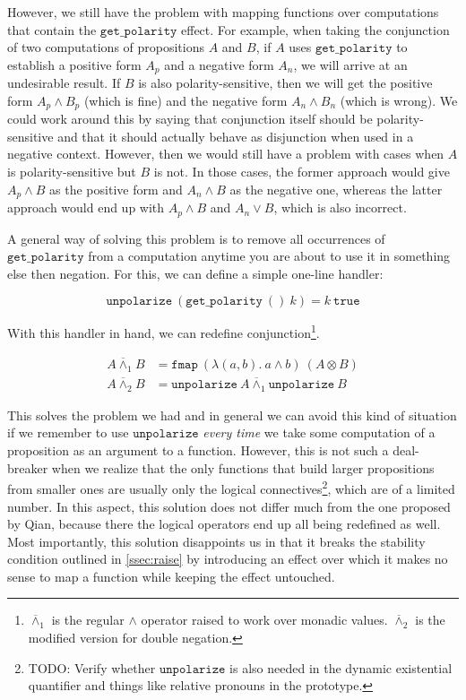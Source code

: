 \documentclass[a4paper,11pt,DIV=12]{scrartcl}
\newcommand{\dand}{\mathbin{\overline{\land}}}
\begin{document}
However, we still have the problem with mapping functions over computations
that contain the $\texttt{get\_polarity}$ effect. For example, when taking
the conjunction of two computations of propositions $A$ and $B$, if $A$
uses $\texttt{get\_polarity}$ to establish a positive form $A_p$ and a
negative form $A_n$, we will arrive at an undesirable result. If $B$ is
also polarity-sensitive, then we will get the positive form $A_p \land B_p$
(which is fine) and the negative form $A_n \land B_n$ (which is wrong). We
could work around this by saying that conjunction itself should be
polarity-sensitive and that it should actually behave as disjunction when
used in a negative context. However, then we would still have a problem
with cases when $A$ is polarity-sensitive but $B$ is not. In those cases,
the former approach would give $A_p \land B$ as the positive form and $A_n
\land B$ as the negative one, whereas the latter approach would end up with
$A_p \land B$ and $A_n \lor B$, which is also incorrect.

A general way of solving this problem is to remove all occurrences of
$\texttt{get\_polarity}$ from a computation anytime you are about to use it
in something else then negation. For this, we can define a simple one-line
handler:

$$
\texttt{unpolarize}\ (\texttt{get\_polarity}\ ()\ k) = k\ \texttt{true}
$$

With this handler in hand, we can redefine conjunction\footnote{$\dand_1$
  is the regular $\land$ operator raised to work over monadic
  values. $\dand_2$ is the modified version for double negation.}.

\begin{align*}
A \dand_1 B &= \texttt{fmap}\ (\lambda (a, b).\ a \land b)\ (A \otimes B) \\
A \dand_2 B &= \texttt{unpolarize}\ A \dand_1 \texttt{unpolarize}\ B
\end{align*}

This solves the problem we had and in general we can avoid this kind of
situation if we remember to use $\texttt{unpolarize}$ \emph{every time} we
take some computation of a proposition as an argument to a
function. However, this is not such a deal-breaker when we realize that the
only functions that build larger propositions from smaller ones are usually
only the logical connectives\footnote{TODO: Verify whether
  $\texttt{unpolarize}$ is also needed in the dynamic existential
  quantifier and things like relative pronouns in the prototype.}, which
are of a limited number. In this aspect, this solution does not differ much
from the one proposed by Qian, because there the logical operators end up
all being redefined as well. Most importantly, this solution disappoints us
in that it breaks the stability condition outlined in \ref{ssec:raise} by
introducing an effect over which it makes no sense to map a function while
keeping the effect untouched.
\end{document}
